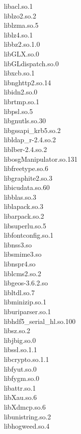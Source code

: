 \begin{multicols}{2}
libacl.so.1 \\
liblzo2.so.2 \\
liblzma.so.5 \\
liblz4.so.1 \\
libbz2.so.1.0 \\
libGLX.so.0 \\
libGLdispatch.so.0 \\
libxcb.so.1 \\
libnghttp2.so.14 \\
libidn2.so.0 \\
librtmp.so.1 \\
libpsl.so.5 \\
libgnutls.so.30 \\
libgssapi\_krb5.so.2 \\
libldap\_r-2.4.so.2 \\
liblber-2.4.so.2 \\
libosgManipulator.so.131 \\
libfreetype.so.6 \\
libgraphite2.so.3 \\
libicudata.so.60 \\
libblas.so.3 \\
liblapack.so.3 \\
libarpack.so.2 \\
libsuperlu.so.5 \\
libfontconfig.so.1 \\
libnss3.so \\
libsmime3.so \\
libnspr4.so \\
liblcms2.so.2 \\
libgeos-3.6.2.so \\
libltdl.so.7 \\
libminizip.so.1 \\
liburiparser.so.1 \\
libhdf5\_serial\_hl.so.100 \\
libsz.so.2 \\
libjbig.so.0 \\
libssl.so.1.1 \\
libcrypto.so.1.1 \\
libfyut.so.0 \\
libfygm.so.0 \\
libattr.so.1 \\
libXau.so.6 \\
libXdmcp.so.6 \\
libunistring.so.2 \\
libhogweed.so.4 \\

\end{multicols}
